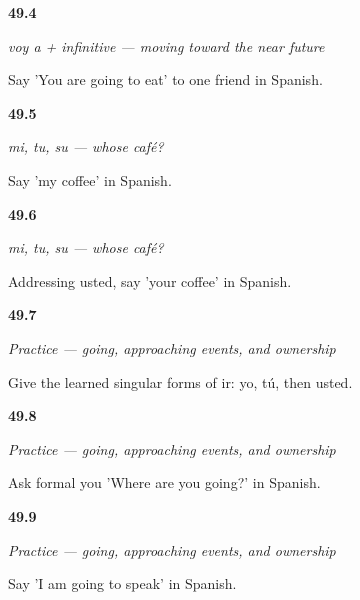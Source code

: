 \noindent\begin{minipage}[t]{\linewidth}
\raggedright
\hypertarget{review-ES-C10-ir-a-futuro-vas-comer}{\textbf{49.4}} \emph{voy a + infinitive — moving toward the near future}\par
\small Say 'You are going to eat' to one friend in Spanish.
\end{minipage}\par\medskip

\noindent\begin{minipage}[t]{\linewidth}
\raggedright
\hypertarget{review-ES-C10-mi-tu-su-my-coffee}{\textbf{49.5}} \emph{mi, tu, su — whose café?}\par
\small Say 'my coffee' in Spanish.
\end{minipage}\par\medskip

\noindent\begin{minipage}[t]{\linewidth}
\raggedright
\hypertarget{review-ES-C10-mi-tu-su-formal-your-coffee}{\textbf{49.6}} \emph{mi, tu, su — whose café?}\par
\small Addressing usted, say 'your coffee' in Spanish.
\end{minipage}\par\medskip

\noindent\begin{minipage}[t]{\linewidth}
\raggedright
\hypertarget{review-ES-C10-practice-ir-forms}{\textbf{49.7}} \emph{Practice — going, approaching events, and ownership}\par
\small Give the learned singular forms of ir: yo, tú, then usted.
\end{minipage}\par\medskip

\noindent\begin{minipage}[t]{\linewidth}
\raggedright
\hypertarget{review-ES-C10-practice-formal-going}{\textbf{49.8}} \emph{Practice — going, approaching events, and ownership}\par
\small Ask formal you 'Where are you going?' in Spanish.
\end{minipage}\par\medskip

\noindent\begin{minipage}[t]{\linewidth}
\raggedright
\hypertarget{review-ES-C10-practice-near-future}{\textbf{49.9}} \emph{Practice — going, approaching events, and ownership}\par
\small Say 'I am going to speak' in Spanish.
\end{minipage}\par\medskip

